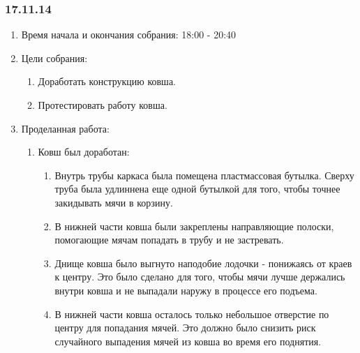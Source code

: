 
\subsubsection{17.11.14}

\begin{enumerate} 
	\item Время начала и окончания собрания:
	18:00 - 20:40
	\item Цели собрания:
	\begin{enumerate}
		\item Доработать конструкцию ковша.
		
		\item Протестировать работу ковша.
		
	\end{enumerate}
	
	\item Проделанная работа:
	\begin{enumerate}
		\item Ковш был доработан:
		\begin{enumerate}
			\item Внутрь трубы каркаса была помещена пластмассовая бутылка. Сверху труба была удлиннена еще одной бутылкой для того, чтобы точнее закидывать мячи в корзину.
			
			\item В нижней части ковша были закреплены направляющие полоски, помогающие мячам попадать в трубу и не застревать.
			
			\item Днище ковша было выгнуто наподобие лодочки - понижаясь от краев к центру. Это было сделано для того, чтобы мячи лучше держались внутри ковша и не выпадали наружу в процессе его подъема.
			
			\item В нижней части ковша осталось только небольшое отверстие по центру для попадания мячей. Это должно было снизить риск случайного выпадения мячей из ковша во время его поднятия.
			
		\end{enumerate}
		

\end{enumerate}
\end{enumerate}
